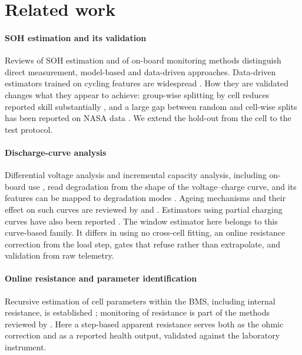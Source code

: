 \documentclass[preprint,12pt,authoryear]{elsarticle}
\begin{document}
\section{Related work}
\label{sec:related}

\paragraph{SOH estimation and its validation}
Reviews of SOH estimation and of on-board monitoring methods
\citep{berecibar2016,waag2014} distinguish direct measurement, model-based and
data-driven approaches. Data-driven estimators trained on cycling features are
widespread \citep{severson2019}. How they are validated changes what they
appear to achieve: group-wise splitting by cell reduces reported skill
substantially \citep{maher2025}, and a large gap between random and cell-wise
splits has been reported on NASA data \citep{le2026}. We extend the hold-out
from the cell to the test protocol.

\paragraph{Discharge-curve analysis}
Differential voltage analysis \citep{bloom2005} and incremental capacity
analysis, including on-board use \citep{weng2013}, read degradation from the
shape of the voltage--charge curve, and its features can be mapped to
degradation modes \citep{dubarry2012,birkl2017}. Ageing mechanisms and their
effect on such curves are reviewed by \citet{vetter2005} and
\citet{barre2013}. Estimators using partial charging curves have also been
reported \citep{tian2021}. The window estimator here belongs to this
curve-based family. It differs in using no cross-cell fitting, an online
resistance correction from the load step, gates that refuse rather than
extrapolate, and validation from raw telemetry.

\paragraph{Online resistance and parameter identification}
Recursive estimation of cell parameters within the BMS, including internal
resistance, is established \citep{plett2004}; monitoring of resistance is part
of the methods reviewed by \citet{waag2014}. Here a step-based apparent
resistance serves both as the ohmic correction and as a reported health
output, validated against the laboratory instrument.
\end{document}
